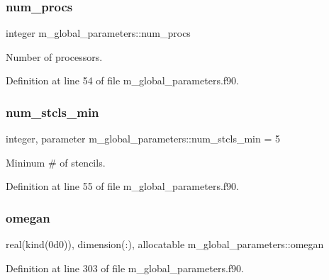 \subsubsection{\texorpdfstring{num\+\_\+procs}{num\_procs}}
{\footnotesize\ttfamily integer m\+\_\+global\+\_\+parameters\+::num\+\_\+procs}



Number of processors. 



Definition at line 54 of file m\+\_\+global\+\_\+parameters.\+f90.

\mbox{\label{namespacem__global__parameters_a71f091e6074e6c248fd7e03218b89218}} 
\subsubsection{\texorpdfstring{num\+\_\+stcls\+\_\+min}{num\_stcls\_min}}
{\footnotesize\ttfamily integer, parameter m\+\_\+global\+\_\+parameters\+::num\+\_\+stcls\+\_\+min = 5}



Mininum \# of stencils. 



Definition at line 55 of file m\+\_\+global\+\_\+parameters.\+f90.

\mbox{\label{namespacem__global__parameters_ae152b49c742928bc52f6da61dd805693}} 
\subsubsection{\texorpdfstring{omegan}{omegan}}
{\footnotesize\ttfamily real(kind(0d0)), dimension(\+:), allocatable m\+\_\+global\+\_\+parameters\+::omegan}



Definition at line 303 of file m\+\_\+global\+\_\+parameters.\+f90.

\mbox{\label{namespacem__global__parameters_ac040dbf547e6d5de8df08e864d8131e7}} 
